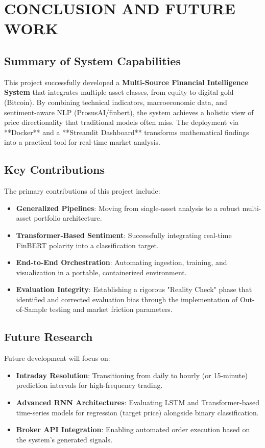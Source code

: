 \chapter{CONCLUSION AND FUTURE WORK}

\section{Summary of System Capabilities}
This project successfully developed a \textbf{Multi-Source Financial Intelligence System} that integrates multiple asset classes, from equity to digital gold (Bitcoin). By combining technical indicators, macroeconomic data, and sentiment-aware NLP (ProsusAI/finbert), the system achieves a holistic view of price directionality that traditional models often miss. The deployment via **Docker** and a **Streamlit Dashboard** transforms mathematical findings into a practical tool for real-time market analysis.

\section{Key Contributions}
The primary contributions of this project include:
\begin{itemize}
    \item \textbf{Generalized Pipelines}: Moving from single-asset analysis to a robust multi-asset portfolio architecture.
    \item \textbf{Transformer-Based Sentiment}: Successfully integrating real-time FinBERT polarity into a classification target.
    \item \textbf{End-to-End Orchestration}: Automating ingestion, training, and visualization in a portable, containerized environment.
    \item \textbf{Evaluation Integrity}: Establishing a rigorous "Reality Check" phase that identified and corrected evaluation bias through the implementation of Out-of-Sample testing and market friction parameters.
\end{itemize}

\section{Future Research}
Future development will focus on:
\begin{itemize}
    \item \textbf{Intraday Resolution}: Transitioning from daily to hourly (or 15-minute) prediction intervals for high-frequency trading.
    \item \textbf{Advanced RNN Architectures}: Evaluating LSTM and Transformer-based time-series models for regression (target price) alongside binary classification.
    \item \textbf{Broker API Integration}: Enabling automated order execution based on the system's generated signals.
\end{itemize}